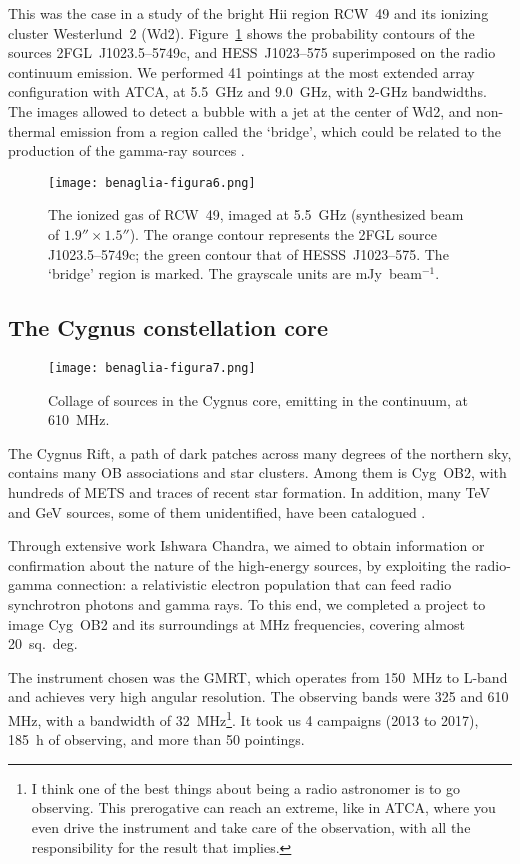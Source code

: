 \documentclass[baaa]{baaa}
\begin{document}
This was the case in a study of the bright H{\sc ii} region RCW~49 and its ionizing cluster Westerlund~2 (Wd2). Figure~\ref{fig:rcw49} shows the probability contours of the sources 2FGL~J1023.5--5749c, and HESS~J1023--575 superimposed on the radio continuum emission. We performed 41 pointings at the most extended array configuration with ATCA, at 5.5~GHz and 9.0~GHz, with 2-GHz bandwidths. The images allowed to detect a bubble with a jet at the {center} of Wd2, and non-thermal emission from a region called the `bridge', which could be related to the production of the gamma-ray sources \citep{benaglia2013}. 

\begin{figure}[!h]
\centering
\texttt{[image: benaglia-figura6.png]}
\caption{The ionized gas of RCW~49, imaged at 5.5~GHz (synthesized beam of $1.9'' \times 1.5''$). The orange contour represents the 2FGL source J1023.5--5749c; the green contour that of HESSS~J1023--575. The `bridge' region is marked. The grayscale units are mJy~beam$^{-1}$.}
\label{fig:rcw49}
\end{figure}

\subsection{The Cygnus constellation core}

\begin{figure*}[!t]
\centering
\texttt{[image: benaglia-figura7.png]}
\caption{Collage of sources in the Cygnus core, emitting in the continuum, at 610~MHz.}
\label{fig:cygnuscollage}
\end{figure*}

The Cygnus Rift, a path of dark patches across many degrees of the northern sky, contains many OB associations and star clusters. Among them is Cyg~OB2, with hundreds of METS and traces of recent star formation. In addition, many TeV and GeV sources, some of them unidentified, have been catalogued \citep[see Fig.~1, and Tables 1 and 2 of][]{benagliacyt2021}.   

{Through extensive work Ishwara Chandra}, we aimed to obtain information or confirmation about the nature of the high-energy sources, by exploiting the radio-gamma connection: a relativistic electron population that can feed radio synchrotron photons and gamma rays. To this end, we completed a project to image Cyg~OB2 and its surroundings at MHz frequencies, covering almost 20~sq.~deg.

The instrument chosen was the GMRT, which operates from 150~MHz to L-band and achieves very high angular resolution. The observing bands were 325 and 610 MHz, with a bandwidth of 32~MHz\footnote{I think one of the best things about being a radio astronomer is to go observing. This prerogative can reach an extreme, like in ATCA, where you even drive the instrument and take care of the observation, with all the responsibility for the result that implies.}. It took us 4 campaigns (2013 to 2017), 185~h of observing, and more than 50 pointings.
\end{document}
